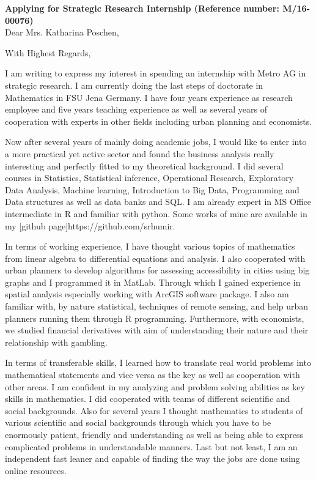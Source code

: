 \documentclass[11pt,a4paper,sans]{moderncv}        %
\title{}                               %
\begin{document}
\date{May 17, 2016}
\opening{\textbf{Applying for  Strategic Research Internship (Reference number: M/16-00076)}\\Dear Mrs. Katharina Poschen,}
\closing{With Highest Regards,}
\makelettertitle

I am writing to express my interest in spending an internship with Metro AG in strategic research. I am currently doing the last steps of doctorate in Mathematics in FSU Jena Germany. I have four years experience as research employee and five years teaching experience as well as several years of cooperation with experts in other fields including urban planning and economists.

Now after several years of mainly doing academic jobs, I would like to enter into a more practical yet active sector and found the business analysis really interesting and perfectly fitted to my theoretical background. I did several courses in Statistics, Statistical inference, Operational Research, Exploratory Data Analysis,  Machine learning, Introduction to Big Data, Programming and Data structures as well as data banks and SQL. I am already expert in MS Office intermediate in R and familiar with python. Some works of mine are available in my [github page]{https://github.com/srhumir}. 

In terms of working experience, I have thought various topics of mathematics from linear algebra to differential equations and analysis. I also cooperated with urban planners to develop algorithms for assessing accessibility in cities using big graphs and I programmed it in MatLab. Through which I gained experience in spatial analysis especially working with ArcGIS software package. I also am familiar with, by nature statistical, techniques of remote sensing, and help urban planners running them through R programming. Furthermore, with economists, we studied financial derivatives with aim of understanding their nature and their relationship with gambling.

In terms of transferable skills, I learned how to translate real world problems into mathematical statements and vice versa as the key as well as cooperation with other areas. I am confident in my analyzing and problem solving abilities as key skills in mathematics. I did cooperated with teams of different scientific and social backgrounds. Also for several years I thought mathematics to students of various scientific and social backgrounds through which you have to be enormously patient, friendly and understanding as well as being able to express complicated problems in understandable manners. Last but not least, I am an independent fast leaner and capable of finding the way the jobs are done using online resources.
\end{document}
